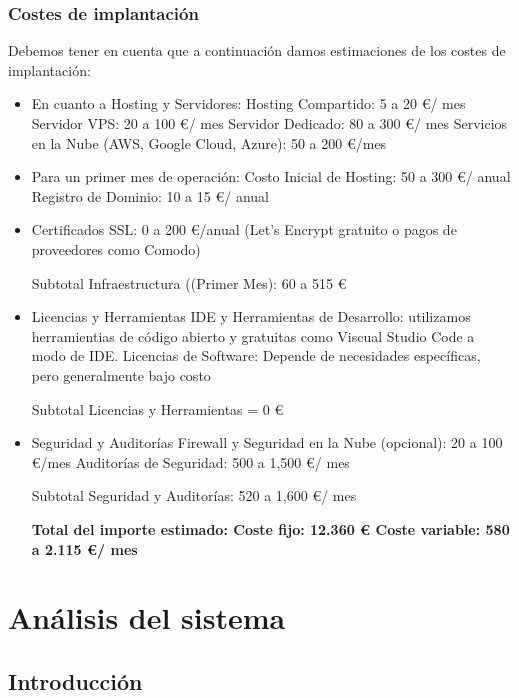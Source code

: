 \documentclass{article}
\begin{document}
\subsubsection{Costes de implantación}
Debemos tener en cuenta que a continuación damos estimaciones de los costes de implantación:
\begin{itemize}

\item En cuanto a Hosting y Servidores:
        \subitem Hosting Compartido: 5 a 20 \euro/ mes
        \subitem Servidor VPS: 20 a 100 \euro/ mes
        \subitem Servidor Dedicado: 80 a 300 \euro/ mes
        \subitem Servicios en la Nube (AWS, Google Cloud, Azure): 50 a 200 \euro/mes

\item Para un primer mes de operación:
        \subitem Costo Inicial de Hosting: 50 a 300 \euro/ anual
        \subitem Registro de Dominio: 10 a 15 \euro/ anual 

\item Certificados SSL: 0 a 200 \euro/anual (Let's Encrypt gratuito o pagos de proveedores como Comodo)

Subtotal Infraestructura ((Primer Mes): 60 a 515 \euro 

\item Licencias y Herramientas
    \subitem IDE y Herramientas de Desarrollo:  utilizamos herramientias de código abierto y gratuitas como Viscual Studio Code a modo de IDE.
    Licencias de Software: Depende de necesidades específicas, pero generalmente bajo costo

Subtotal Licencias y Herramientas = 0 \euro
\item Seguridad y Auditorías
    \subitem Firewall y Seguridad en la Nube (opcional): 20 a 100 \euro /mes
    \subitem Auditorías de Seguridad: 500 a 1,500 \euro / mes

Subtotal Seguridad y Auditorías: 520 a 1,600 \euro / mes


\textbf{Total del importe estimado:
    \subitem Coste fijo: 12.360 \euro
    \subitem Coste variable: 580 a 2.115 \euro/ mes}
\end{itemize}

\section{Análisis del sistema}

\subsection{Introducción}
\end{document}

